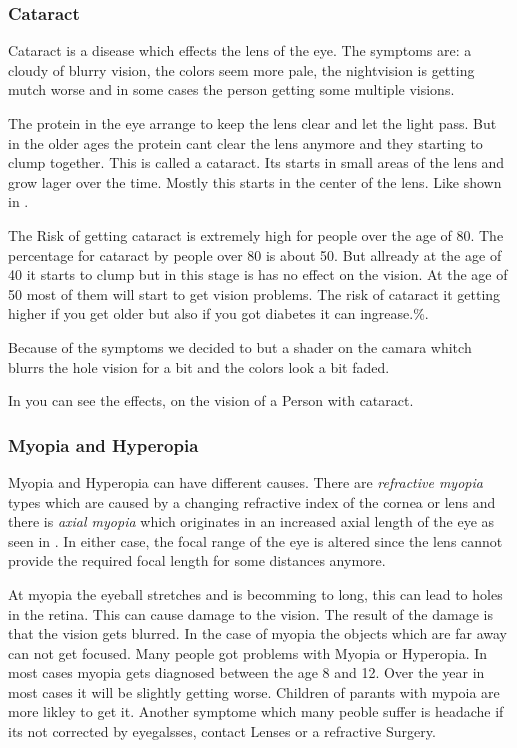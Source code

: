 \documentclass{sig-alternate-05-2015}
\begin{document}
\subsubsection{Cataract}

Cataract is a disease which effects the lens of the eye. The symptoms are: a cloudy of blurry vision, the colors seem more pale, the nightvision is getting mutch worse and in some cases the person getting some multiple visions.

The protein in the eye arrange to keep the lens clear and let the light pass. But in the older ages the protein cant clear the lens anymore and they starting to clump together. This is called a cataract. Its starts in small areas of the lens and grow lager over the time. Mostly this starts in the center of the lens. Like shown in .

The Risk of getting cataract is extremely high for people over the age of 80. The percentage for cataract by people over 80 is about 50. But allready at the age of 40 it starts to clump but in this stage is has no effect on the vision. At the age of 50 most of them will start to get vision problems. The risk of cataract it getting higher if you get older but also if you got diabetes it can ingrease.\%.~\cite{cataractfacts}

Because of the symptoms we decided to but a shader on the camara whitch blurrs the hole vision for a bit and the colors look a bit faded.

In  you can see the effects, on the vision of a Person with cataract.

\subsubsection{Myopia and Hyperopia}

Myopia and Hyperopia can have different causes. There are \emph{refractive myopia} types which are caused by a changing refractive index of the cornea or lens and there is \emph{axial myopia} which originates in an increased axial length of the eye as seen in .
In either case, the focal range of the eye is altered since the lens cannot provide the required focal length for some distances anymore.

At myopia the eyeball stretches and is becomming to long, this can lead to holes in the retina. This can cause damage to the vision. The result of the damage is that the vision gets blurred. In the case of myopia the objects which are far away can not get focused. Many people got problems with Myopia or Hyperopia. In most cases myopia gets diagnosed between the age 8 and 12. Over the year in most cases it will be slightly getting worse. Children of parants with mypoia are more likley to get it. Another symptome which many peoble suffer is headache if its not corrected by eyegalsses, contact Lenses or a refractive Surgery.
\end{document}
